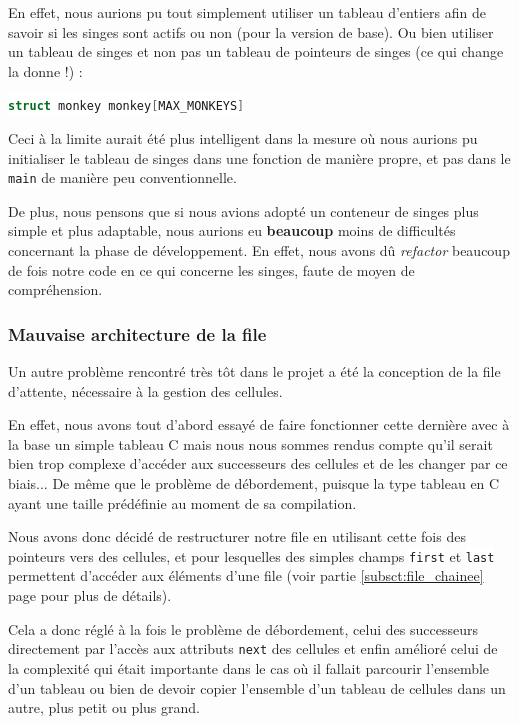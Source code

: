 \documentclass{article}
\newcommand{\inlinecode}[2]{\colorbox{white}{\lstinline[language=#1]$#2$}}
\begin{document}
En effet, nous aurions pu tout simplement utiliser un tableau d'entiers afin de savoir si les singes sont actifs ou non (pour la version de base). Ou bien utiliser un tableau de singes et non pas un tableau de pointeurs de singes (ce qui change la donne !) :

\inlinecode{C}{struct monkey monkey[MAX_MONKEYS]}

Ceci à la limite aurait été plus intelligent dans la mesure où nous aurions pu initialiser le tableau de singes dans une fonction de manière propre, et pas dans le \inlinecode{C}{main} de manière peu conventionnelle.

De plus, nous pensons que si nous avions adopté un conteneur de singes plus simple et plus adaptable, nous aurions eu \textbf{beaucoup} moins de difficultés concernant la phase de développement. En effet, nous avons dû \textit{refactor} beaucoup de fois notre code en ce qui concerne les singes, faute de moyen de compréhension.


\subsubsection{Mauvaise architecture de la file}
\label{subsct:mauvaise_archi_file}

Un autre problème rencontré très tôt dans le projet a été la conception de la file d'attente, nécessaire à la gestion des cellules.

En effet, nous avons tout d'abord essayé de faire fonctionner cette dernière avec à la base un simple tableau C mais nous nous sommes rendus compte qu'il serait bien trop complexe d'accéder aux successeurs des cellules et de les changer par ce biais... De même que le problème de débordement, puisque la type tableau en C ayant une taille prédéfinie au moment de sa compilation.

Nous avons donc décidé de restructurer notre file en utilisant cette fois des pointeurs vers des cellules, et pour lesquelles des simples champs
\inlinecode{C}{first} et \inlinecode{C}{last} permettent d'accéder aux éléments d'une file (voir partie \ref{subsct:file_chainee} page \pageref{subsct:file_chainee} pour plus de détails).

Cela a donc réglé à la fois le problème de débordement, celui des successeurs directement par l'accès aux attributs \inlinecode{C}{next} des cellules et enfin amélioré celui de la complexité qui était importante dans le cas où il fallait parcourir l'ensemble d'un tableau ou bien de devoir copier l'ensemble d'un tableau de cellules dans un autre, plus petit ou plus grand.
\end{document}
